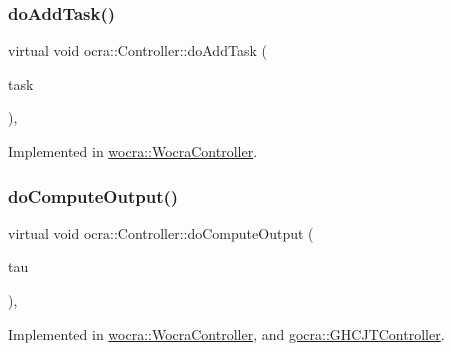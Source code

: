 \subsubsection{\texorpdfstring{do\+Add\+Task()}{doAddTask()}}
{\footnotesize\ttfamily virtual void ocra\+::\+Controller\+::do\+Add\+Task (\begin{DoxyParamCaption}\item[{std\+::shared\+\_\+ptr$<$ \hyperlink{classocra_1_1Task}{Task} $>$}]{task }\end{DoxyParamCaption})\hspace{0.3cm}{\ttfamily [protected]}, {}}



Implemented in \hyperlink{classwocra_1_1WocraController_aa9a681aa5c0f043638d4d2956c2913c1}{wocra\+::\+Wocra\+Controller}.

\hypertarget{classocra_1_1Controller_a8ca85413067d948459afa5981b3dda32}{}\label{classocra_1_1Controller_a8ca85413067d948459afa5981b3dda32} 
\subsubsection{\texorpdfstring{do\+Compute\+Output()}{doComputeOutput()}}
{\footnotesize\ttfamily virtual void ocra\+::\+Controller\+::do\+Compute\+Output (\begin{DoxyParamCaption}\item[{Eigen\+::\+Vector\+Xd \&}]{tau }\end{DoxyParamCaption})\hspace{0.3cm}{\ttfamily [protected]}, {}}



Implemented in \hyperlink{classwocra_1_1WocraController_aaf750c45d062220e3f78ccb1c8a41d07}{wocra\+::\+Wocra\+Controller}, and \hyperlink{classgocra_1_1GHCJTController_a0f2412763e005e9e18b9129e460411bd}{gocra\+::\+G\+H\+C\+J\+T\+Controller}.

\hypertarget{classocra_1_1Controller_a823933d261a12aac49f8a0ef56823ea4}{}\label{classocra_1_1Controller_a823933d261a12aac49f8a0ef56823ea4} 
